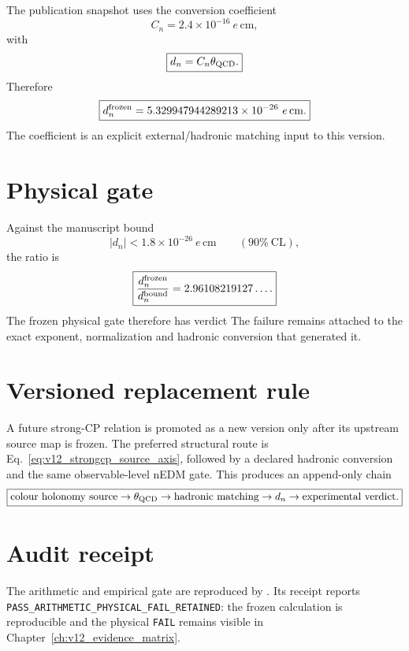 The publication snapshot uses the conversion coefficient
\begin{equation}
C_n=2.4\times10^{-16}\ e\,\mathrm{cm},
\end{equation}
with
\begin{equation}
\boxed{
d_n=C_n\theta_{\rm QCD}.
}
\label{eq:v12_nedm_map}
\end{equation}
Therefore
\begin{equation}
\boxed{
d_n^{\rm frozen}
=5.329947944289213\times10^{-26}\ e\,\mathrm{cm}.
}
\label{eq:v12_nedm_value}
\end{equation}
The coefficient is an explicit external/hadronic matching input to this version.

\section{Physical gate}

Against the manuscript bound
\begin{equation}
|d_n|<1.8\times10^{-26}\ e\,\mathrm{cm}
\qquad(90\%\ \mathrm{CL}),
\label{eq:v12_nedm_bound}
\end{equation}
the ratio is
\begin{equation}
\boxed{
\frac{d_n^{\rm frozen}}{d_n^{\rm bound}}
=2.96108219127\ldots .
}
\end{equation}
The frozen physical gate therefore has verdict
The failure remains attached to the exact exponent, normalization and hadronic conversion that generated it.

\section{Versioned replacement rule}

A future strong-CP relation is promoted as a new version only after its upstream source map is frozen. The preferred structural route is Eq.~\eqref{eq:v12_strongcp_source_axis}, followed by a declared hadronic conversion and the same observable-level nEDM gate. This produces an append-only chain
\[
\boxed{
\text{colour holonomy source}
\to\theta_{\rm QCD}
\to\text{hadronic matching}
\to d_n
\to\text{experimental verdict}.
}
\]

\section{Audit receipt}

The arithmetic and empirical gate are reproduced by
.
Its receipt
reports \texttt{PASS\_ARITHMETIC\_PHYSICAL\_FAIL\_RETAINED}: the frozen calculation is reproducible and the physical \texttt{FAIL} remains visible in Chapter~\ref{ch:v12_evidence_matrix}.
